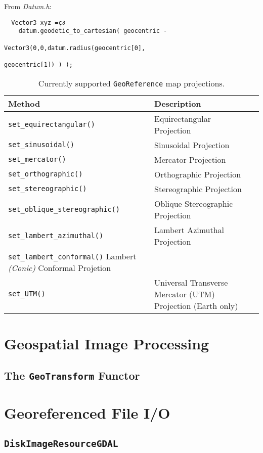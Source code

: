 From {\it Datum.h}:
\begin{verbatim}
  Vector3 xyz =ç∂
    datum.geodetic_to_cartesian( geocentric -
                                 Vector3(0,0,datum.radius(geocentric[0],
                                                          geocentric[1]) ) );
\end{verbatim}


\begin{table}[t]\begin{centering}
\begin{tabular}{|l|l|l|} \hline
Method & Description \\ \hline \hline
\verb#set_equirectangular()# & Equirectangular Projection \\ \hline
\verb#set_sinusoidal()# & Sinusoidal Projection \\ \hline
\verb#set_mercator()# & Mercator Projection \\ \hline
\verb#set_orthographic()# & Orthographic Projection \\ \hline
\verb#set_stereographic()# & Stereographic Projection \\ \hline
\verb#set_oblique_stereographic()# & Oblique Stereographic Projection \\ \hline
\verb#set_lambert_azimuthal()# & Lambert Azimuthal Projection \\ \hline
\verb#set_lambert_conformal()# Lambert \emph{(Conic)} Conformal Projetion \\ \hline
\verb#set_UTM()# & Universal Transverse Mercator (UTM) Projection (Earth only) \\ \hline
\end{tabular}
\caption{Currently supported {\tt GeoReference} map projections.}
\label{tbl:georeference-map-projections}
\end{centering}\end{table}

\section{Geospatial Image Processing}
\subsection{The {\tt GeoTransform} Functor}

\section{Georeferenced File I/O}
\subsection{{\tt DiskImageResourceGDAL}}
